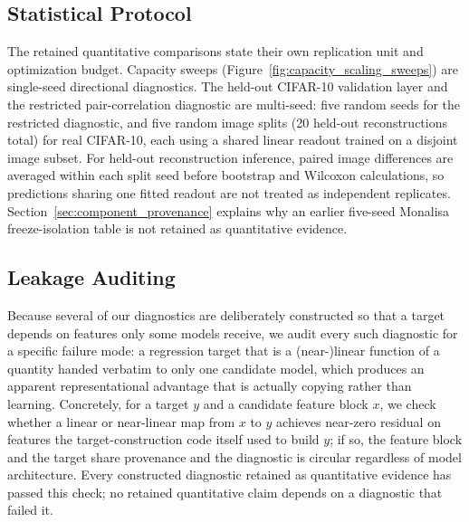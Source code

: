 \documentclass[11pt]{article}
\begin{document}
\subsection{Statistical Protocol}
The retained quantitative comparisons state their own replication unit and optimization budget. Capacity sweeps (Figure~\ref{fig:capacity_scaling_sweeps}) are single-seed directional diagnostics. The held-out CIFAR-10 validation layer and the restricted pair-correlation diagnostic are multi-seed: five random seeds for the restricted diagnostic, and five random image splits (20 held-out reconstructions total) for real CIFAR-10, each using a shared linear readout trained on a disjoint image subset. For held-out reconstruction inference, paired image differences are averaged within each split seed before bootstrap and Wilcoxon calculations, so predictions sharing one fitted readout are not treated as independent replicates. Section~\ref{sec:component_provenance} explains why an earlier five-seed Monalisa freeze-isolation table is not retained as quantitative evidence.

\subsection{Leakage Auditing}
Because several of our diagnostics are deliberately constructed so that a target depends on features only some models receive, we audit every such diagnostic for a specific failure mode: a regression target that is a (near-)linear function of a quantity handed verbatim to only one candidate model, which produces an apparent representational advantage that is actually copying rather than learning. Concretely, for a target $y$ and a candidate feature block $x$, we check whether a linear or near-linear map from $x$ to $y$ achieves near-zero residual on features the target-construction code itself used to build $y$; if so, the feature block and the target share provenance and the diagnostic is circular regardless of model architecture. Every constructed diagnostic retained as quantitative evidence has passed this check; no retained quantitative claim depends on a diagnostic that failed it.
\end{document}
